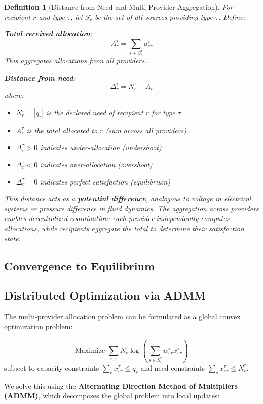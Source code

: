 \documentclass[11pt]{article}
\newtheorem{definition}{Definition}
\begin{document}
\begin{definition}[Distance from Need and Multi-Provider Aggregation]
For recipient $r$ and type $\tau$, let $S_r^\tau$ be the set of all sources providing type $\tau$. Define:

\textbf{Total received allocation}:
\[
A_r^\tau = \sum_{s \in S_r^\tau} a_{sr}^\tau
\]
This aggregates allocations from all providers.

\textbf{Distance from need}:
\[
\Delta_r^\tau = N_r^\tau - A_r^\tau
\]
where:
\begin{itemize}
\item $N_r^\tau = |q_r|$ is the declared need of recipient $r$ for type $\tau$
\item $A_r^\tau$ is the total allocated to $r$ (sum across all providers)
\item $\Delta_r^\tau > 0$ indicates under-allocation (undershoot)
\item $\Delta_r^\tau < 0$ indicates over-allocation (overshoot)
\item $\Delta_r^\tau = 0$ indicates perfect satisfaction (equilibrium)
\end{itemize}

This distance acts as a \textbf{potential difference}, analogous to voltage in electrical systems or pressure difference in fluid dynamics. The aggregation across providers enables decentralized coordination: each provider independently computes allocations, while recipients aggregate the total to determine their satisfaction state.
\end{definition}

\subsection{Convergence to Equilibrium}

\subsection{Distributed Optimization via ADMM}
The multi-provider allocation problem can be formulated as a global convex optimization problem:

\[
\text{Maximize } \sum_{r,\tau} N_r^\tau \log\left( \sum_{s \in S_r^\tau} w_{sr}^\tau x_{sr}^\tau \right)
\]
subject to capacity constraints $\sum_r x_{sr}^\tau \le q_s$ and need constraints $\sum_s x_{sr}^\tau \le N_r^\tau$.

We solve this using the \textbf{Alternating Direction Method of Multipliers (ADMM)}, which decomposes the global problem into local updates:
\end{document}
